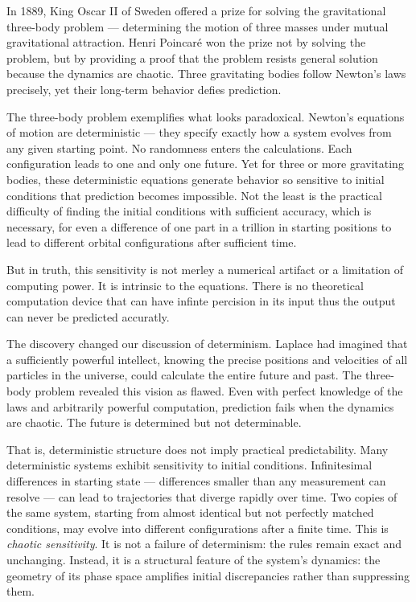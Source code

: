In 1889, King Oscar II of Sweden offered a prize for solving the gravitational three-body problem — determining the motion of three masses under mutual gravitational attraction. Henri Poincaré won the prize not by solving the problem, but by providing a proof that the problem resists general solution because the dynamics are chaotic. Three gravitating bodies follow Newton's laws precisely, yet their long-term behavior defies prediction.

The three-body problem exemplifies what looks paradoxical. Newton's equations of motion are deterministic — they specify exactly how a system evolves from any given starting point. No randomness enters the calculations. Each configuration leads to one and only one future. Yet for three or more gravitating bodies, these deterministic equations generate behavior so sensitive to initial conditions that prediction becomes impossible. Not the least is the practical difficulty of finding the initial conditions with sufficient accuracy, which is necessary, for even a difference of one part in a trillion in starting positions to lead to different orbital configurations after sufficient time.

But in truth, this sensitivity is not merley a numerical artifact or a limitation of computing power. It is intrinsic to the equations. There is no theoretical computation device that can have infinte percision in its input thus the output can never be predicted accuratly. 

The discovery changed our discussion of determinism. Laplace had imagined that a sufficiently powerful intellect, knowing the precise positions and velocities of all particles in the universe, could calculate the entire future and past. The three-body problem revealed this vision as flawed. Even with perfect knowledge of the laws and arbitrarily powerful computation, prediction fails when the dynamics are chaotic. The future is determined but not determinable.

That is, deterministic structure does not imply practical predictability. Many deterministic systems exhibit sensitivity to initial conditions. Infinitesimal differences in starting state — differences smaller than any measurement can resolve — can lead to trajectories that diverge rapidly over time. Two copies of the same system, starting from almost identical but not perfectly matched conditions, may evolve into different configurations after a finite time. This is \emph{chaotic sensitivity}. It is not a failure of determinism: the rules remain exact and unchanging. Instead, it is a structural feature of the system's dynamics: the geometry of its phase space amplifies initial discrepancies rather than suppressing them.

